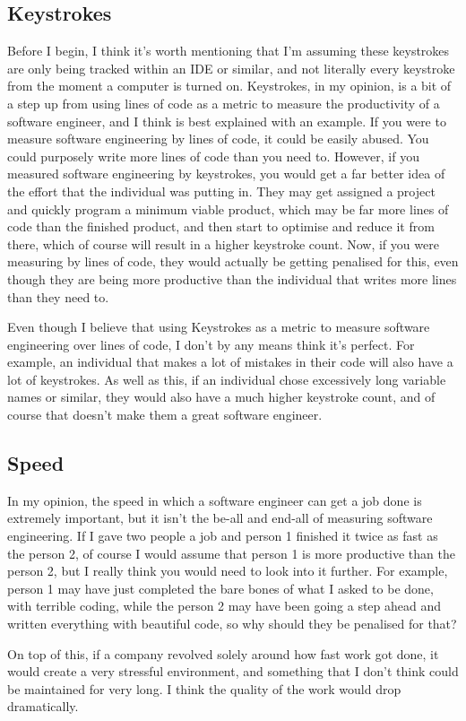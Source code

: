 \documentclass[12pt]{report}
\begin{document}
\subsection{Keystrokes}
Before I begin, I think it's worth mentioning that I'm assuming these keystrokes are only being tracked within an IDE or similar, and not literally every keystroke from the moment a computer is turned on. Keystrokes, in my opinion, is a bit of a step up from using lines of code as a metric to measure the productivity of a software engineer, and I think is best explained with an example. If you were to measure software engineering by lines of code, it could be easily abused. You could purposely write more lines of code than you need to. However, if you measured software engineering by keystrokes, you would get a far better idea of the effort that the individual was putting in. They may get assigned a project and quickly program a minimum viable product, which may be far more lines of code than the finished product, and then start to optimise and reduce it from there, which of course will result in a higher keystroke count. Now, if you were measuring by lines of code, they would actually be getting penalised for this, even though they are being more productive than the individual that writes more lines than they need to. \par
Even though I believe that using Keystrokes as a metric to measure software engineering over lines of code, I don't by any means think it's perfect. For example, an individual that makes a lot of mistakes in their code will also have a lot of keystrokes. As well as this, if an individual chose excessively long variable names or similar, they would also have a much higher keystroke count, and of course that doesn't make them a great software engineer. 

\subsection{Speed}
In my opinion, the speed in which a software engineer can get a job done is extremely important, but it isn't the be-all and end-all of measuring software engineering. If I gave two people a job and person 1 finished it twice as fast as the person 2, of course I would assume that person 1 is more productive than the person 2, but I really think you would need to look into it further. For example, person 1 may have just completed the bare bones of what I asked to be done, with terrible coding, while the person 2 may have been going a step ahead and written everything with beautiful code, so why should they be penalised for that? \par
On top of this, if a company revolved solely around how fast work got done, it would create a very stressful environment, and something that I don't think could be maintained for very long. I think the quality of the work would drop dramatically. 
\end{document}
